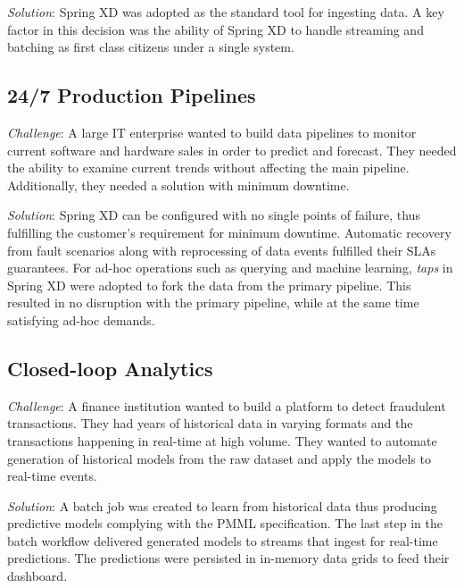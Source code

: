 \textit{Solution}: Spring XD was adopted as the standard tool for ingesting data.
A key factor in this decision was the ability of Spring XD to handle streaming
and batching as first class citizens under a single system.

\subsection{24/7 Production Pipelines}
\textit{Challenge}: A large IT enterprise wanted to build data pipelines to
monitor current software and hardware sales in order to predict and forecast.
They needed the ability to examine current trends without affecting the main
pipeline. Additionally, they needed a solution with minimum downtime.

\textit{Solution}: Spring XD can be configured with no single points of failure,
thus fulfilling the customer's requirement for minimum downtime.
Automatic recovery from fault scenarios along with reprocessing of data events 
fulfilled their SLAs guarantees. For ad-hoc operations such as querying and machine 
learning, \emph{taps} in Spring XD were adopted to fork the  data from the primary
pipeline. This resulted in no disruption with the primary pipeline, while at
the same time satisfying ad-hoc demands.

\subsection{Closed-loop Analytics}
\textit{Challenge}: A finance institution wanted to build a platform to detect
fraudulent transactions. They had years of historical data in varying formats
and the transactions happening in real-time at high volume. They wanted to
automate generation of historical models from the raw dataset and apply the models
to real-time events.

\textit{Solution}: A batch job was created to learn from historical data thus
producing predictive models complying with the PMML specification. The last step
in the batch workflow delivered generated models to streams that ingest for
real-time predictions. The predictions were persisted in in-memory data grids
to feed their dashboard.
